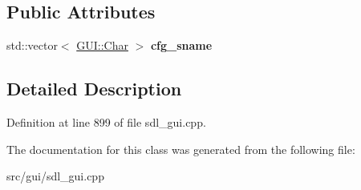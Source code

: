 \subsection*{Public Attributes}
\begin{DoxyCompactItemize}
\item 
\hypertarget{classAutoexecEditor_af1d96f7032869aac93bba3fae830c902}{std\-::vector$<$ \hyperlink{namespaceGUI_af6b04b46d40197b4f00e553d7d1a3e4c}{G\-U\-I\-::\-Char} $>$ {\bfseries cfg\-\_\-sname}}\label{classAutoexecEditor_af1d96f7032869aac93bba3fae830c902}

\end{DoxyCompactItemize}


\subsection{Detailed Description}


Definition at line 899 of file sdl\-\_\-gui.\-cpp.



The documentation for this class was generated from the following file\-:\begin{DoxyCompactItemize}
\item 
src/gui/sdl\-\_\-gui.\-cpp\end{DoxyCompactItemize}
